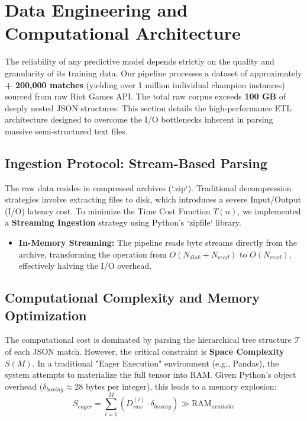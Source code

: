 \documentclass[12pt, a4paper]{article}
\begin{document}
    \section{Data Engineering and Computational Architecture}

    The reliability of any predictive model depends strictly on the quality and granularity of its training data. Our pipeline processes a dataset of approximately \textbf{+ 200,000 matches} (yielding over 1 million individual champion instances) sourced from raw Riot Games API. The total raw corpus exceeds \textbf{100 GB} of deeply nested JSON structures. This section details the high-performance ETL architecture designed to overcome the I/O bottlenecks inherent in parsing massive semi-structured text files.

    \subsection{Ingestion Protocol: Stream-Based Parsing}
    The raw data resides in compressed archives (`.zip`). Traditional decompression strategies involve extracting files to disk, which introduces a severe Input/Output (I/O) latency cost. To minimize the Time Cost Function $T(n)$, we implemented a \textbf{Streaming Ingestion} strategy using Python's `zipfile` library.

    \begin{itemize}
        \item \textbf{In-Memory Streaming:} The pipeline reads byte streams directly from the archive, transforming the operation from $O(N_{disk} + N_{read})$ to $O(N_{read})$, effectively halving the I/O overhead.
    \end{itemize}

    \subsection{Computational Complexity and Memory Optimization}
    The computational cost is dominated by parsing the hierarchical tree structure $\mathcal{T}$ of each JSON match. However, the critical constraint is \textbf{Space Complexity} $S(M)$. In a traditional "Eager Execution" environment (e.g., Pandas), the system attempts to materialize the full tensor into RAM. Given Python's object overhead ($\delta_{boxing} \approx 28$ bytes per integer), this leads to a memory explosion:
    \begin{equation}
        S_{eager} = \sum_{i=1}^{M} (D_{raw}^{(i)} \cdot \delta_{boxing}) \gg \text{RAM}_{available}
    \end{equation}
\end{document}
